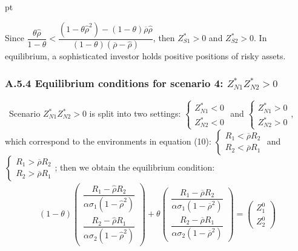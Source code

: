 \documentclass[10pt]{article}
\begin{document}
 pt

Since $ \dfrac{\theta {\hat \rho}}{1 - \theta} < \dfrac{(1 - \theta {\hat \rho}^2) - (1 - \theta) \overline{\rho} {\hat \rho}}{(1 - \theta) (\overline{\rho} - {\hat \rho})} $, then $ Z_{S 1}^* > 0 $ and $ Z_{S 2}^* > 0 $. In equilibrium, a sophisticated investor holds positive positions of risky assets.

\subsubsection*{A.5.4 \quad Equilibrium conditions for scenario 4: $ Z_{N 1}^* Z_{N 2}^* > 0 $}

\quad \ 
Scenario $ Z_{N 1}^* Z_{N 2}^* > 0 $ is split into two settings: $ \left\{ \begin{matrix} Z_{N 1}^* < 0 \\ Z_{N 2}^* < 0 \end{matrix} \right. $ and $ \left\{ \begin{matrix} Z_{N 1}^* > 0 \\ Z_{N 2}^* > 0 \end{matrix} \right. $, which correspond to the environments in equation (10): $ \left\{ \begin{matrix} R_1 < \overline{\rho} R_2 \\ R_2 < \overline{\rho} R_1 \end{matrix} \right. $ and $ \left\{ \begin{matrix} R_1 > \overline{\rho} R_2 \\ R_2 > \overline{\rho} R_1 \end{matrix} \right. $; then we obtain the equilibrium condition:
\begin{eqnarray}
(1 - \theta) \left( \begin{matrix} \dfrac{R_1 - \hat \rho R_2}{\alpha \sigma_1 (1 - \hat \rho^2)} \\ \dfrac{R_2 - \hat \rho R_1}{\alpha \sigma_2 (1 - \hat \rho^2)} \end{matrix} \right) + \theta \left( \begin{matrix} \dfrac{R_1 - \overline{\rho} R_2}{\alpha \sigma_1 (1 - \overline{\rho}^2)} \\ \dfrac{R_2 - \overline{\rho} R_1}{\alpha \sigma_2 (1 - \overline{\rho}^2)} \end{matrix} \right) = \left( \begin{matrix} Z_1^0 \\ Z_2^0 \end{matrix} \right)
\end{eqnarray}
\end{document}
